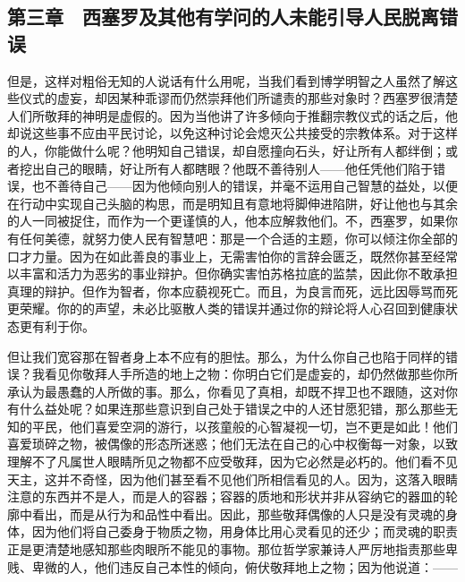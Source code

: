 
\subsection{第三章　西塞罗及其他有学问的人未能引导人民脱离错误}

但是，这样对粗俗无知的人说话有什么用呢，当我们看到博学明智之人虽然了解这些仪式的虚妄，却因某种乖谬而仍然崇拜他们所谴责的那些对象时？西塞罗很清楚人们所敬拜的神明是虚假的。因为当他讲了许多倾向于推翻宗教仪式的话之后，他却说这些事不应由平民讨论，以免这种讨论会熄灭公共接受的宗教体系。对于这样的人，你能做什么呢？他明知自己错误，却自愿撞向石头，好让所有人都绊倒；或者挖出自己的眼睛，好让所有人都瞎眼？他既不善待别人——他任凭他们陷于错误，也不善待自己——因为他倾向别人的错误，并毫不运用自己智慧的益处，以便在行动中实现自己头脑的构思，而是明知且有意地将脚伸进陷阱，好让他也与其余的人一同被捉住，而作为一个更谨慎的人，他本应解救他们。不，西塞罗，如果你有任何美德，就努力使人民有智慧吧：那是一个合适的主题，你可以倾注你全部的口才力量。因为在如此善良的事业上，无需害怕你的言辞会匮乏，既然你甚至经常以丰富和活力为恶劣的事业辩护。但你确实害怕苏格拉底的监禁，因此你不敢承担真理的辩护。但作为智者，你本应藐视死亡。而且，为良言而死，远比因辱骂而死更荣耀。你的的声望，未必比驱散人类的错误并通过你的辩论将人心召回到健康状态更有利于你。\par

但让我们宽容那在智者身上本不应有的胆怯。那么，为什么你自己也陷于同样的错误？我看见你敬拜人手所造的地上之物：你明白它们是虚妄的，却仍然做那些你所承认为最愚蠢的人所做的事。那么，你看见了真相，却既不捍卫也不跟随，这对你有什么益处呢？如果连那些意识到自己处于错误之中的人还甘愿犯错，那么那些无知的平民，他们喜爱空洞的游行，以孩童般的心智凝视一切，岂不更是如此！他们喜爱琐碎之物，被偶像的形态所迷惑；他们无法在自己的心中权衡每一对象，以致理解不了凡属世人眼睛所见之物都不应受敬拜，因为它必然是必朽的。他们看不见天主，这并不奇怪，因为他们甚至看不见他们所相信看见的人。因为，这落入眼睛注意的东西并不是人，而是人的容器；容器的质地和形状并非从容纳它的器皿的轮廓中看出，而是从行为和品性中看出。因此，那些敬拜偶像的人只是没有灵魂的身体，因为他们将自己委身于物质之物，用身体比用心灵看见的还少；而灵魂的职责正是更清楚地感知那些肉眼所不能见的事物。那位哲学家兼诗人严厉地指责那些卑贱、卑微的人，他们违反自己本性的倾向，俯伏敬拜地上之物；因为他说道：——\par

\par

